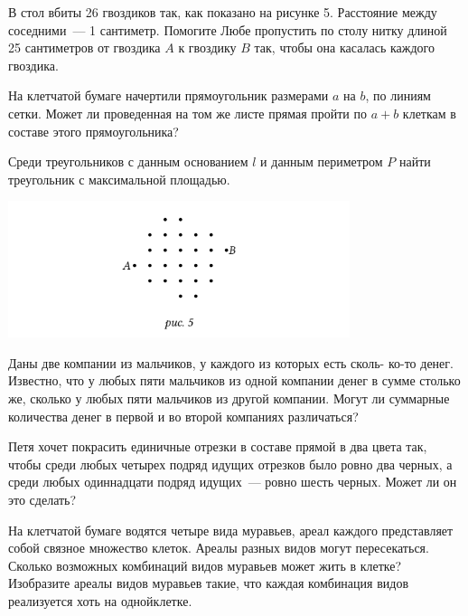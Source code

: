 \begin{itemize}
\itA В стол вбиты 26 гвоздиков так, как показано на рисунке 5. Расстояние между соседними~— 1 сантиметр. Помогите Любе пропустить по столу нитку длиной 25 сантиметров от гвоздика $A$ к гвоздику $B$ так, чтобы она касалась каждого гвоздика.

\itB На клетчатой бумаге начертили прямоугольник размерами $a$ на $b$, по линиям сетки. Может ли проведенная на том же листе прямая пройти по $a+b$ клеткам в составе этого прямоугольника?

\itC Среди треугольников с данным основанием $l$ и данным периметром $P$ найти треугольник с максимальной площадью.
\end{itemize}

\begin{center}
  \includegraphics[width=10cm]{stats/2016/Figures/Gvozdiks.png}
\end{center}

\begin{itemize}
\itA Даны две компании из мальчиков, у каждого из которых есть сколь- ко-то денег. Известно, что у любых пяти мальчиков из одной компании денег в сумме столько же, сколько у любых пяти мальчиков из другой компании. Могут ли суммарные количества денег в первой и во второй компаниях различаться?

\itB Петя хочет покрасить единичные отрезки в составе прямой в два цвета так, чтобы среди любых четырех подряд идущих отрезков было ровно два черных, а среди любых одиннадцати подряд идущих~— ровно шесть черных. Может ли он это сделать?

\itC На клетчатой бумаге водятся четыре вида муравьев, ареал каждого представляет собой связное множество клеток. Ареалы разных видов могут пересекаться. Сколько возможных комбинаций видов муравьев может жить в клетке? Изобразите ареалы видов муравьев такие, что каждая комбинация видов реализуется хоть на одной\linebreak клетке.
\end{itemize}

